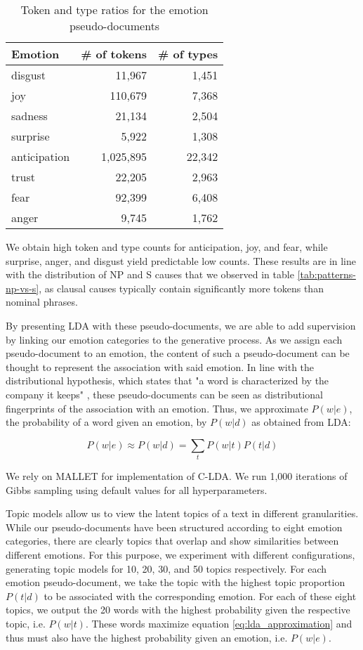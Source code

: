 \begin{table}[]
\centering
\begin{tabular}{l|r|r}
{\bf Emotion} & {\bf \# of tokens} & {\bf \# of types} \\\hline
disgust & 11,967 & 1,451 \\
joy & 110,679 & 7,368 \\
sadness & 21,134 & 2,504 \\
surprise & 5,922 & 1,308 \\
anticipation & 1,025,895 & 22,342 \\
trust & 22,205 & 2,963 \\
fear & 92,399 & 6,408 \\
anger & 9,745 & 1,762
\end{tabular}
\caption{Token and type ratios for the emotion pseudo-documents}
\label{tab:token-type-pseudo-doc}
\end{table}

We obtain high token and type counts for anticipation, joy, and fear, while surprise, anger, and disgust yield predictable low counts. These results are in line with the distribution of NP and S causes that we observed in table \ref{tab:patterns-np-vs-s}, as clausal causes typically contain significantly more tokens than nominal phrases.

By presenting LDA with these pseudo-documents, we are able to add supervision by linking our emotion categories to the generative process. As we assign each pseudo-document to an emotion, the content of such a pseudo-document can be thought to represent the association with said emotion. In line with the distributional hypothesis, which states that "a word is characterized by the company it keeps" \cite{firth}, these pseudo-documents can be seen as distributional fingerprints of the association with an emotion. Thus, we approximate $P(w|e)$, the probability of a word given an emotion, by $P(w|d)$ as obtained from LDA:

\begin{equation} \label{eq:lda_approximation}
P(w|e) \approx P(w|d) = \sum_t P(w|t) P(t|d)
\end{equation}

We rely on MALLET \cite{mallet} for implementation of C-LDA. We run 1,000 iterations of Gibbs sampling using default values for all hyperparameters.

Topic models allow us to view the latent topics of a text in different granularities. While our pseudo-documents have been structured according to eight emotion categories, there are clearly topics that overlap and show similarities between different emotions. For this purpose, we experiment with different configurations, generating topic models for 10, 20, 30, and 50 topics respectively. For each emotion pseudo-document, we take the topic with the highest topic proportion $P(t|d)$ to be associated with the corresponding emotion. For each of these eight topics, we output the 20 words with the highest probability given the respective topic, i.e. $P(w|t)$. These words maximize equation \ref{eq:lda_approximation} and thus must also have the highest probability given an emotion, i.e. $P(w|e)$.


